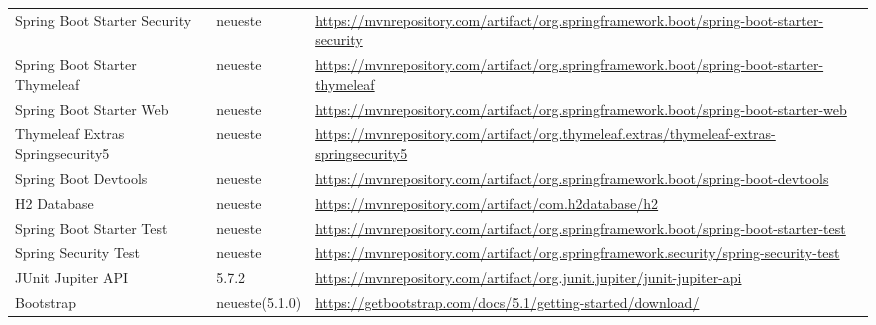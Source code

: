 {\begin{center}
\begin{longtable}[h]{p{4cm} p{2cm} p{8cm}}
    \rowcolor[HTML]{E7E7E7}
    Spring Boot Starter Security     & neueste          & \url{https://mvnrepository.com/artifact/org.springframework.boot/spring-boot-starter-security}   \\
    Spring Boot Starter Thymeleaf    & neueste          & \url{https://mvnrepository.com/artifact/org.springframework.boot/spring-boot-starter-thymeleaf}  \\
    \rowcolor[HTML]{E7E7E7}
    Spring Boot Starter Web          & neueste          & \url{https://mvnrepository.com/artifact/org.springframework.boot/spring-boot-starter-web}        \\
    Thymeleaf Extras Springsecurity5 & neueste          & \url{https://mvnrepository.com/artifact/org.thymeleaf.extras/thymeleaf-extras-springsecurity5}   \\
    \rowcolor[HTML]{E7E7E7}
    Spring Boot Devtools             & neueste          & \url{https://mvnrepository.com/artifact/org.springframework.boot/spring-boot-devtools}           \\
    H2 Database                      & neueste          & \url{https://mvnrepository.com/artifact/com.h2database/h2}                                       \\
    \rowcolor[HTML]{E7E7E7}
    Spring Boot Starter Test         & neueste          & \url{https://mvnrepository.com/artifact/org.springframework.boot/spring-boot-starter-test}       \\
    Spring Security Test             & neueste          & \url{https://mvnrepository.com/artifact/org.springframework.security/spring-security-test}       \\
    \rowcolor[HTML]{E7E7E7}
    JUnit Jupiter API                & 5.7.2            & \url{https://mvnrepository.com/artifact/org.junit.jupiter/junit-jupiter-api}                     \\
    Bootstrap                        & neueste(5.1.0)   & \url{https://getbootstrap.com/docs/5.1/getting-started/download/}                                \\
\end{longtable}


\end{center}}
